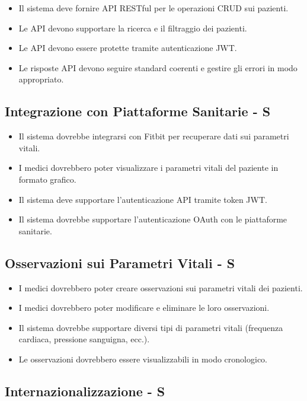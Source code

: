 \documentclass[12pt,a4paper,oneside]{report}
\begin{document}
\begin{itemize}
    \item Il sistema deve fornire API RESTful per le operazioni CRUD sui pazienti.
    \item Le API devono supportare la ricerca e il filtraggio dei pazienti.
    \item Le API devono essere protette tramite autenticazione JWT.
    \item Le risposte API devono seguire standard coerenti e gestire gli errori in modo appropriato.
\end{itemize}

\subsection{Integrazione con Piattaforme Sanitarie - S}

\begin{itemize}
    \item Il sistema dovrebbe integrarsi con Fitbit per recuperare dati sui parametri vitali.
    \item I medici dovrebbero poter visualizzare i parametri vitali del paziente in formato grafico.
    \item Il sistema deve supportare l'autenticazione API tramite token JWT.
    \item Il sistema dovrebbe supportare l'autenticazione OAuth con le piattaforme sanitarie.
\end{itemize}

\subsection{Osservazioni sui Parametri Vitali - S}

\begin{itemize}
    \item I medici dovrebbero poter creare osservazioni sui parametri vitali dei pazienti.
    \item I medici dovrebbero poter modificare e eliminare le loro osservazioni.
    \item Il sistema dovrebbe supportare diversi tipi di parametri vitali (frequenza cardiaca, pressione sanguigna, ecc.).
    \item Le osservazioni dovrebbero essere visualizzabili in modo cronologico.
\end{itemize}

\subsection{Internazionalizzazione - S}
\end{document}
